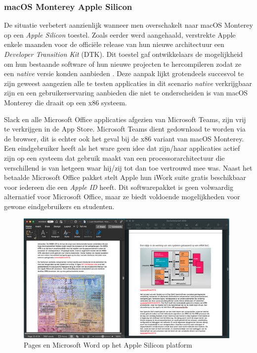 \subsubsection{macOS Monterey Apple Silicon}
De situatie verbetert aanzienlijk wanneer men overschakelt naar macOS Monterey op een \textit{Apple Silicon} toestel. Zoals eerder werd aangehaald, verstrekte Apple enkele maanden voor de officiële release van hun nieuwe architectuur een \textit{Developer Transition Kit} (DTK). Dit toestel gaf ontwikkelaars de mogelijkheid om hun bestaande software of hun nieuwe projecten te hercompileren zodat ze een \textit{native} versie konden aanbieden \autocite{Apple2020}. Deze aanpak lijkt grotendeels succesvol te zijn geweest aangezien alle te testen applicaties in dit scenario \textit{native} verkrijgbaar zijn en een gebruikerservaring aanbieden die niet te onderscheiden is van macOS Monterey die draait op een x86 systeem.

Slack en alle Microsoft Office applicaties afgezien van Microsoft Teams, zijn vrij te verkrijgen in de App Store. Microsoft Teams dient gedownload te worden via de browser, dit is echter ook het geval bij de x86 variant van macOS Monterey. Een eindgebruiker heeft als het ware geen idee dat zijn/haar applicaties actief zijn op een systeem dat gebruik maakt van een processorarchitectuur die verschillend is van hetgeen waar hij/zij tot dan toe vertrouwd mee was. Naast het betaalde Microsoft Office pakket stelt Apple hun iWork suite gratis beschikbaar voor iedereen die een \textit{Apple ID} heeft. Dit softwarepakket is geen volwaardig alternatief voor Microsoft Office, maar ze biedt voldoende mogelijkheden voor gewone eindgebruikers en studenten.

\begin{figure}[!h]
	\centering
	\includegraphics[width=110mm, scale=0.7]{img/office_macOSM1.png}
	\caption{Pages en Microsoft Word op het Apple Silicon platform}
\end{figure}

